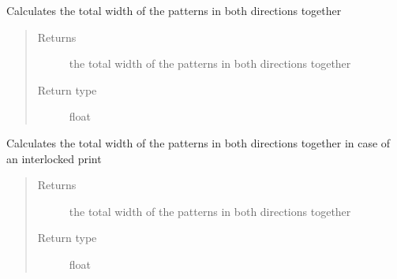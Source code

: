 \documentclass[letterpaper,10pt,english]{sphinxmanual}
\begin{document}
\begin{fulllineitems}
\begin{fulllineitems}
\begin{quote}
\begin{description}
\end{description}\end{quote}

\end{fulllineitems}


\begin{fulllineitems}
\label{\detokenize{index:calibration_pattern.calibration_pattern.total_width}}
\sphinxAtStartPar
Calculates the total width of the patterns in both directions together
\begin{quote}\begin{description}
\item[{Returns}] \leavevmode
\sphinxAtStartPar
the total width of the patterns in both directions together

\item[{Return type}] \leavevmode
\sphinxAtStartPar
float

\end{description}\end{quote}

\end{fulllineitems}


\begin{fulllineitems}
\label{\detokenize{index:calibration_pattern.calibration_pattern.total_width_interlocked}}
\sphinxAtStartPar
Calculates the total width of the patterns in both directions together in case of an interlocked print
\begin{quote}\begin{description}
\item[{Returns}] \leavevmode
\sphinxAtStartPar
the total width of the patterns in both directions together

\item[{Return type}] \leavevmode
\sphinxAtStartPar
float

\end{description}\end{quote}


\end{fulllineitems}
\end{fulllineitems}
\end{document}
